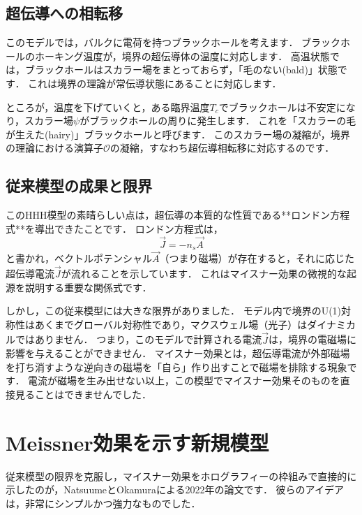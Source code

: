 \documentclass[b5paper,11pt,dvipdfmx]{jsarticle}
\numberwithin{equation}{section}
\theoremstyle{definition}
\begin{document}
\subsection{超伝導への相転移}

このモデルでは，バルクに電荷を持つブラックホールを考えます．
ブラックホールのホーキング温度が，境界の超伝導体の温度に対応します．
高温状態では，ブラックホールはスカラー場をまとっておらず，「毛のない(bald)」状態です．
これは境界の理論が常伝導状態にあることに対応します．

ところが，温度を下げていくと，ある臨界温度$T_c$でブラックホールは不安定になり，スカラー場$\psi$がブラックホールの周りに発生します．
これを「スカラーの毛が生えた(hairy)」ブラックホールと呼びます\cite{Hartnoll08a}．
このスカラー場の凝縮が，境界の理論における演算子$\mathcal{O}$の凝縮，すなわち超伝導相転移に対応するのです．

\subsection{従来模型の成果と限界}

このHHH模型の素晴らしい点は，超伝導の本質的な性質である**ロンドン方程式**を導出できたことです\cite{Hartnoll08b}．
ロンドン方程式は，
$$ \vec{J} = -n_s \vec{A} $$
と書かれ，ベクトルポテンシャル$\vec{A}$（つまり磁場）が存在すると，それに応じた超伝導電流$\vec{J}$が流れることを示しています．
これはマイスナー効果の微視的な起源を説明する重要な関係式です．

しかし，この従来模型には大きな限界がありました．
モデル内で境界のU(1)対称性はあくまでグローバル対称性であり，マクスウェル場（光子）はダイナミカルではありません．
つまり，このモデルで計算される電流$\vec{J}$は，境界の電磁場に影響を与えることができません．
マイスナー効果とは，超伝導電流が外部磁場を打ち消すような逆向きの磁場を「自ら」作り出すことで磁場を排除する現象です．
電流が磁場を生み出せない以上，この模型でマイスナー効果そのものを直接見ることはできませんでした．

\clearpage

\section{Meissner効果を示す新規模型}

従来模型の限界を克服し，マイスナー効果をホログラフィーの枠組みで直接的に示したのが，NatsuumeとOkamuraによる2022年の論文\cite{Natsuume22}です．
彼らのアイデアは，非常にシンプルかつ強力なものでした．
\end{document}
